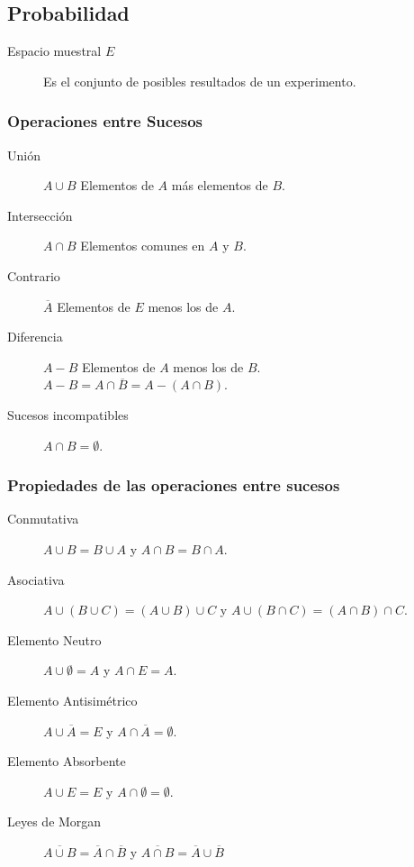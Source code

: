 \documentclass[a4paper]{article}
\newlength{\mylength}
\newenvironment{marco}{
	\setlength{\fboxsep}{5pt}
	\setlength{\mylength}{\textwidth}
	\addtolength{\mylength}{-2\fboxsep}
	\addtolength{\mylength}{-2\fboxrule}
	\noindent
	\begin{Sbox}
	\begin{minipage}{\mylength}
	\setlength{\abovedisplayskip}{3pt}
	\setlength{\belowdisplayskip}{3pt}
}
{
	\end{minipage}
	\end{Sbox}
	\fbox{\TheSbox}
}
\begin{document}
\subsection*{Probabilidad}
\begin{marco}
\begin{multicols}{2}
\begin{description}
\item [Espacio muestral $E$] Es el conjunto de posibles resultados de un experimento.
\end{description}
\subsubsection*{Operaciones entre Sucesos}
\begin{description}
\item [Unión] $A\cup B$ Elementos de $A$ más elementos de $B$.
\item [Intersección] $A\cap B$ Elementos comunes en $A$ y $B$.
\item [Contrario] $\overline{A}$ Elementos de $E$ menos los de $A$.
\item [Diferencia] $A-B$ Elementos de $A$ menos los de $B$.\\
$A-B =A\cap \overline{B} = A -(A\cap B)$.
\item [Sucesos incompatibles] $A\cap B=\emptyset$.
\end{description}
\subsubsection*{Propiedades de las operaciones entre sucesos}
\begin{description}
\item [Conmutativa] $A\cup B=B\cup A$ y $A\cap B=B\cap A$.
\item [Asociativa] $A\cup (B\cup C)=(A\cup B)\cup C$ y $A\cup (B\cap C)=(A\cap
B)\cap C$.
\item [Elemento Neutro] $A\cup \emptyset=A$ y $A\cap E=A$.
\item [Elemento Antisimétrico] $A\cup \overline{A}=E$ y $A\cap
\overline{A}=\emptyset$.
\item [Elemento Absorbente] $A\cup E=E$ y $A\cap \emptyset=\emptyset$.
\item [Leyes de Morgan] $\overline{A\cup B}=\overline{A}\cap\overline{B}$ y $\overline{A\cap B}=\overline{A}\cup\overline{B}$
\end{description}

\end{multicols}
\end{marco}
\end{document}
